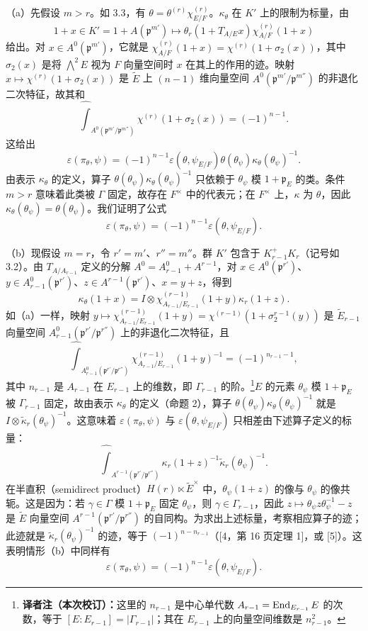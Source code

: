 （a）先假设 $m>r$。如 3.3，有 $\theta=\theta^{(r)}\chi_{E/F}^{(r)}$。$\kappa_\theta$ 在 $K'$ 上的限制为标量，由
\[
1+x\in K'=1+A(\mathfrak p^{m'})\longmapsto
\theta_r(1+T_{A/E}x)\chi_{A/F}^{(r)}(1+x)
\]
给出。对 $x\in A^0(\mathfrak p^{m'})$，它就是 $\chi_{A/F}^{(r)}(1+x)=\chi^{(r)}(1+\sigma_2(x))$，其中 $\sigma_2(x)$ 是将 $\bigwedge^2E$ 视为 $F$ 向量空间时 $x$ 在其上的作用的迹。映射 $x\mapsto\chi^{(r)}(1+\sigma_2(x))$ 是 $\widetilde E$ 上 $(n-1)$ 维向量空间 $A^0(\mathfrak p^{m'}/\mathfrak p^{m''})$ 的非退化二次特征，故其和
\[
\widehat{\int}_{A^0(\mathfrak p^{m'}/\mathfrak p^{m''})}\chi^{(r)}(1+\sigma_2(x))=(-1)^{n-1}.
\]
这给出
\[
\varepsilon(\pi_\theta,\psi)=(-1)^{n-1}\varepsilon(\theta,\psi_{E/F})\theta(\theta_\psi)\kappa_\theta(\theta_\psi)^{-1}.
\]
由表示 $\kappa_\theta$ 的定义，算子 $\theta(\theta_\psi)\kappa_\theta(\theta_\psi)^{-1}$ 只依赖于 $\theta_\psi$ 模 $1+\mathfrak p_E$ 的类。条件 $m>r$ 意味着此类被 $\Gamma$ 固定，故存在 $F^\times$ 中的代表元；在 $F^\times$ 上，$\kappa$ 为 $\theta$，因此 $\kappa_\theta(\theta_\psi)=\theta(\theta_\psi)$。我们证明了公式
\[
\varepsilon(\pi_\theta,\psi)=(-1)^{n-1}\varepsilon(\theta,\psi_{E/F}).
\]

（b）现假设 $m=r$，令 $r'=m'$、$r''=m''$。群 $K'$ 包含于 $K_{r-1}^+K_r$（记号如 3.2）。由 $T_{A/A_{r-1}}$ 定义的分解 $A^0=A_{r-1}^0+A^{r-1}$，对 $x\in A^0(\mathfrak p^{r'})$、$y\in A_{r-1}^0(\mathfrak p^{r'})$、$z\in A^{r-1}(\mathfrak p^{r'})$、$x=y+z$，得到
\[
\kappa_\theta(1+x)=I\otimes\chi_{A_{r-1}/E_{r-1}}^{(r-1)}(1+y)\kappa_r(1+z).
\]
如（a）一样，映射 $y\mapsto\chi_{A_{r-1}/E_{r-1}}^{(r-1)}(1+y)=\chi^{(r-1)}(1+\sigma_2^{r-1}(y))$ 是 $\widetilde E_{r-1}$ 向量空间 $A_{r-1}^0(\mathfrak p^{r'}/\mathfrak p^{r''})$ 上的非退化二次特征，且
\[
\widehat{\int}_{A_{r-1}^0(\mathfrak p^{r'}/\mathfrak p^{r''})}
\chi_{A_{r-1}/E_{r-1}}^{(r-1)}(1+y)^{-1}=(-1)^{n_{r-1}-1},
\]
其中 $n_{r-1}$ 是 $A_{r-1}$ 在 $E_{r-1}$ 上的维数，即 $\Gamma_{r-1}$ 的阶。\footnote{\textbf{译者注（本次校订）：}这里的 $n_{r-1}$ 是中心单代数 $A_{r-1}=\operatorname{End}_{E_{r-1}}E$ 的次数，等于 $[E:E_{r-1}]=|\Gamma_{r-1}|$；其在 $E_{r-1}$ 上的向量空间维数是 $n_{r-1}^2$。}$E$ 的元素 $\theta_\psi$ 模 $1+\mathfrak p_E$ 被 $\Gamma_{r-1}$ 固定，故由表示 $\kappa_\theta$ 的定义（命题 2），算子 $\theta(\theta_\psi)\kappa_\theta(\theta_\psi)^{-1}$ 就是 $I\otimes\widetilde\kappa_r(\theta_\psi)^{-1}$。这意味着 $\varepsilon(\pi_\theta,\psi)$ 与 $\varepsilon(\theta,\psi_{E/F})$ 只相差由下述算子定义的标量：
\[
\widehat{\int}_{A^{r-1}(\mathfrak p^{r'}/\mathfrak p^{r''})}
\kappa_r(1+z)^{-1}\widetilde\kappa_r(\theta_\psi)^{-1}.
\]
在半直积（semidirect product）$H(r)\ltimes\widetilde E^\times$ 中，$\theta_\psi(1+z)$ 的像与 $\theta_\psi$ 的像共轭。这是因为：若 $\gamma\in\Gamma$ 模 $1+\mathfrak p_E$ 固定 $\theta_\psi$，则 $\gamma\in\Gamma_{r-1}$，因此 $z\mapsto\theta_\psi z\theta_\psi^{-1}-z$ 是 $\widetilde E$ 向量空间 $A^{r-1}(\mathfrak p^{r'}/\mathfrak p^{r''})$ 的自同构。为求出上述标量，考察相应算子的迹；此迹就是 $\widetilde\kappa_r(\theta_\psi)^{-1}$ 的迹，等于 $(-1)^{n-n_{r-1}}$（[4，第 16 页定理 1]，或 [5]）。这表明情形（b）中同样有
\[
\varepsilon(\pi_\theta,\psi)=(-1)^{n-1}\varepsilon(\theta,\psi_{E/F}).
\]
